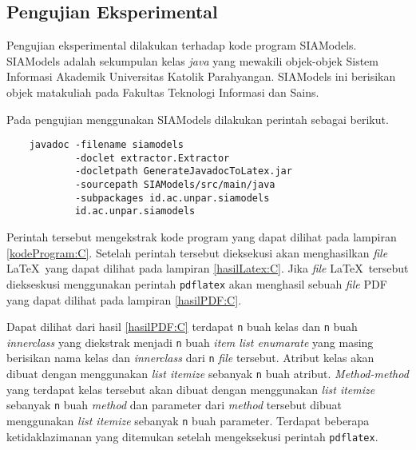 \subsection{Pengujian Eksperimental}
\label{sec:pengujian eksperimental}
Pengujian eksperimental dilakukan terhadap kode program SIAModels. SIAModels adalah sekumpulan kelas {\it java} yang mewakili objek-objek Sistem Informasi Akademik Universitas Katolik Parahyangan. SIAModels ini berisikan objek matakuliah pada Fakultas Teknologi Informasi dan Sains.

Pada pengujian menggunakan SIAModels dilakukan perintah sebagai berikut.

\begin{verbatim}
	javadoc -filename siamodels
	        -doclet extractor.Extractor
	        -docletpath GenerateJavadocToLatex.jar
	        -sourcepath SIAModels/src/main/java
	        -subpackages id.ac.unpar.siamodels
	        id.ac.unpar.siamodels
\end{verbatim}

Perintah tersebut mengekstrak kode program yang dapat dilihat pada lampiran \ref{kodeProgram:C}. Setelah perintah tersebut dieksekusi akan menghasilkan {\it file} \LaTeX\ yang dapat dilihat pada lampiran \ref{hasilLatex:C}. Jika {\it file} \LaTeX\ tersebut diekseskusi menggunakan perintah {\tt pdflatex} akan menghasil sebuah {\it file} PDF yang dapat dilihat pada lampiran \ref{hasilPDF:C}.

Dapat dilihat dari hasil \ref{hasilPDF:C} terdapat {\tt n} buah kelas dan {\tt n} buah {\it innerclass} yang diekstrak menjadi {\tt n} buah {\it item list enumarate} yang masing berisikan nama kelas dan {\it innerclass} dari {\tt n} {\it file} tersebut. Atribut kelas akan dibuat dengan menggunakan {\it list itemize} sebanyak {\tt n} buah atribut. {\it Method-method} yang terdapat kelas tersebut akan dibuat dengan menggunakan {\it list itemize} sebanyak {\tt n} buah {\it method} dan parameter dari {\it method} tersebut dibuat menggunakan {\it list itemize} sebanyak {\tt n} buah parameter. Terdapat beberapa ketidaklazimanan yang ditemukan setelah mengeksekusi perintah {\tt pdflatex}.

